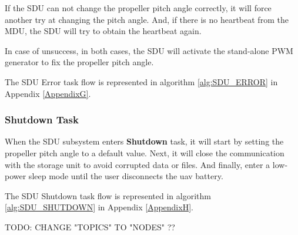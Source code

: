 If the SDU can not change the propeller pitch angle correctly, it will force another try at changing the pitch angle.
And, if there is no heartbeat from the MDU, the SDU will try to obtain the heartbeat again.

In case of unsuccess, in both cases, the SDU will activate the stand-alone \gls{PWM} generator to fix the propeller pitch angle.

The SDU Error task flow is represented in algorithm \ref{alg:SDU_ERROR} in Appendix \ref{AppendixG}.

\subsubsection{Shutdown Task}
When the SDU subsystem enters \textbf{Shutdown} task, it will start by setting the propeller pitch angle to a default value.
Next, it will close the communication with the storage unit to avoid corrupted data or files.
And finally, enter a low-power sleep mode until the user disconnects the \gls{uav} battery.

The SDU Shutdown task flow is represented in algorithm \ref{alg:SDU_SHUTDOWN} in Appendix \ref{AppendixH}.


TODO: CHANGE "TOPICS" TO "NODES" ??